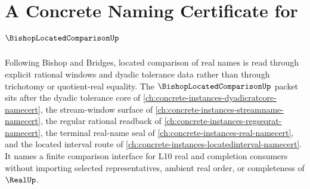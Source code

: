 \chapter{A Concrete Naming Certificate for $\BishopLocatedComparisonUp$}
\label{ch:concrete-instances-bishop-located-comparison-namecert}

Following Bishop and Bridges, located comparison of real names is read through explicit rational windows and dyadic tolerance data rather than through trichotomy or quotient-real equality. The $\BishopLocatedComparisonUp$ packet sits after the dyadic tolerance core of \autoref{ch:concrete-instances-dyadicratcore-namecert}, the stream-window surface of \autoref{ch:concrete-instances-streamname-namecert}, the regular rational readback of \autoref{ch:concrete-instances-regseqrat-namecert}, the terminal real-name seal of \autoref{ch:concrete-instances-real-namecert}, and the located interval route of \autoref{ch:concrete-instances-locatedinterval-namecert}. It names a finite comparison interface for L10 real and completion consumers without importing selected representatives, ambient real order, or completeness of $\RealUp$.

